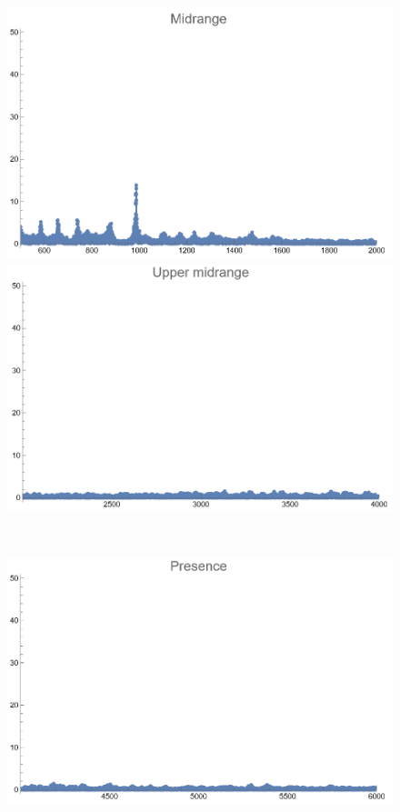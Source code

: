 \documentclass[12pt, letterpaper]{article}
\begin{document}
\begin{figure}[H]
\begin{minipage}{.3\textwidth}
  \end{minipage}
  \begin{minipage}{0.03\textwidth}\end{minipage}
  \begin{minipage}{.3\textwidth}
    \centering
    \includegraphics[width=.9\linewidth]{imgs/Cancion5/mid.png}
  \end{minipage}
  \begin{minipage}{0.03\textwidth}\end{minipage}
  \begin{minipage}{.3\textwidth}
    \centering
    \includegraphics[width=.9\linewidth]{imgs/Cancion5/upmid.png}
  \end{minipage} \medskip \\
  \begin{minipage}{.3\textwidth}
    \centering
    \includegraphics[width=.9\linewidth]{imgs/Cancion5/presence.png}

\end{minipage}
\end{figure}
\end{document}
